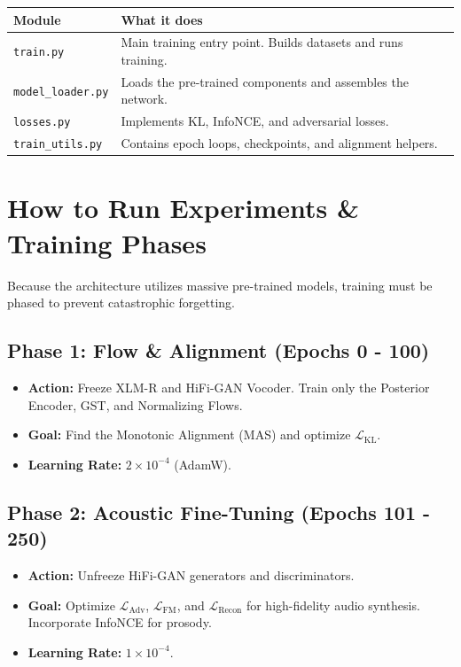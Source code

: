 \documentclass[11pt]{article}
\newcommand{\pathtt}[1]{\texttt{#1}}
\begin{document}
\begin{longtable}{>{\raggedright\arraybackslash}p{} >{\raggedright\arraybackslash}p{}}
\toprule
\textbf{Module} & \textbf{What it does} \\
\midrule
\pathtt{train.py} & Main training entry point. Builds datasets and runs training. \\
\pathtt{model\_loader.py} & Loads the pre-trained components and assembles the network. \\
\pathtt{losses.py} & Implements KL, InfoNCE, and adversarial losses. \\
\pathtt{train\_utils.py} & Contains epoch loops, checkpoints, and alignment helpers. \\
\bottomrule
\end{longtable}

\section{How to Run Experiments \& Training Phases}

Because the architecture utilizes massive pre-trained models, training must be phased to prevent catastrophic forgetting.

\subsection{Phase 1: Flow \& Alignment (Epochs 0 - 100)}
\begin{itemize}[leftmargin=1.5em]
    \item \textbf{Action:} Freeze XLM-R and HiFi-GAN Vocoder. Train only the Posterior Encoder, GST, and Normalizing Flows.
    \item \textbf{Goal:} Find the Monotonic Alignment (MAS) and optimize $\mathcal{L}_{\text{KL}}$.
    \item \textbf{Learning Rate:} $2 \times 10^{-4}$ (AdamW).
\end{itemize}

\subsection{Phase 2: Acoustic Fine-Tuning (Epochs 101 - 250)}
\begin{itemize}[leftmargin=1.5em]
    \item \textbf{Action:} Unfreeze HiFi-GAN generators and discriminators.
    \item \textbf{Goal:} Optimize $\mathcal{L}_{\text{Adv}}$, $\mathcal{L}_{\text{FM}}$, and $\mathcal{L}_{\text{Recon}}$ for high-fidelity audio synthesis. Incorporate InfoNCE for prosody.
    \item \textbf{Learning Rate:} $1 \times 10^{-4}$.
\end{itemize}
\end{document}
